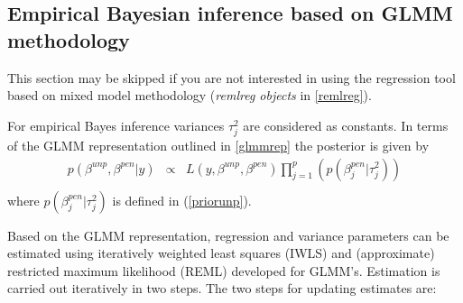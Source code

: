 \subsection{Empirical Bayesian inference based on GLMM methodology}
\label{glmmmeth}

This section may be skipped if you are not interested in using the
regression tool based on mixed model methodology ({\em remlreg
objects} in \autoref{remlreg}).


For empirical Bayes inference variances $\tau^2_j$ are considered
as constants. In terms of the GLMM representation outlined in
\autoref{glmmrep} the posterior is given by
\begin{equation}
\label{posterior2}
\begin{array}{lll}
 p(\beta^{unp},\beta^{pen}|y) & \propto & L(y,\beta^{unp},\beta^{pen})
\displaystyle \prod_{j=1}^p \left( p(\beta_j^{pen}|\tau_j^2)  \right) \\
 \end{array}
\end{equation}
where $p(\beta_j^{pen}|\tau_j^2)$ is defined in (\ref{priorunp}).

Based on the GLMM representation, regression and variance
parameters can be estimated using iteratively weighted least
squares (IWLS) and (approximate) restricted maximum likelihood
(REML) developed for GLMM's. Estimation is carried out iteratively
in two steps. The two steps for updating estimates are:

